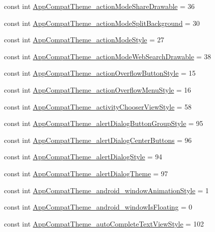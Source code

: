 \begin{CompactItemize}
const int \hyperlink{class__2doo_1_1_droid_1_1_resource_1_1_styleable_ff9288e6cb8ed83b9b31d1d58b8dc501}{AppCompatTheme\_\-actionModeShareDrawable} = 36
\item 
const int \hyperlink{class__2doo_1_1_droid_1_1_resource_1_1_styleable_8d5dd527ae99def55148154a99eea5f7}{AppCompatTheme\_\-actionModeSplitBackground} = 30
\item 
const int \hyperlink{class__2doo_1_1_droid_1_1_resource_1_1_styleable_7be1a9dafd56653f9360dbd1e57be841}{AppCompatTheme\_\-actionModeStyle} = 27
\item 
const int \hyperlink{class__2doo_1_1_droid_1_1_resource_1_1_styleable_998879e96366a9a0d90be6c00cbe3289}{AppCompatTheme\_\-actionModeWebSearchDrawable} = 38
\item 
const int \hyperlink{class__2doo_1_1_droid_1_1_resource_1_1_styleable_552ed91513281793f3c27ceaa3ff5cc9}{AppCompatTheme\_\-actionOverflowButtonStyle} = 15
\item 
const int \hyperlink{class__2doo_1_1_droid_1_1_resource_1_1_styleable_093df6f32eed924bbdbe4e8e8c224aeb}{AppCompatTheme\_\-actionOverflowMenuStyle} = 16
\item 
const int \hyperlink{class__2doo_1_1_droid_1_1_resource_1_1_styleable_6020d325769311d33f7508a43ed0f019}{AppCompatTheme\_\-activityChooserViewStyle} = 58
\item 
const int \hyperlink{class__2doo_1_1_droid_1_1_resource_1_1_styleable_7fd400690318b80a7c5ff5c5e5482c0c}{AppCompatTheme\_\-alertDialogButtonGroupStyle} = 95
\item 
const int \hyperlink{class__2doo_1_1_droid_1_1_resource_1_1_styleable_ae67cace9f3f50dc65a446fd84b26507}{AppCompatTheme\_\-alertDialogCenterButtons} = 96
\item 
const int \hyperlink{class__2doo_1_1_droid_1_1_resource_1_1_styleable_0887bc9745a3d1091a7bcfb94fc291dd}{AppCompatTheme\_\-alertDialogStyle} = 94
\item 
const int \hyperlink{class__2doo_1_1_droid_1_1_resource_1_1_styleable_57f809a4d3a79ab21d58067e964521d3}{AppCompatTheme\_\-alertDialogTheme} = 97
\item 
const int \hyperlink{class__2doo_1_1_droid_1_1_resource_1_1_styleable_be3e1a29ba21b41f0905876d35933fb6}{AppCompatTheme\_\-android\_\-windowAnimationStyle} = 1
\item 
const int \hyperlink{class__2doo_1_1_droid_1_1_resource_1_1_styleable_0063d7d50644d003a3773e1e0747ec2b}{AppCompatTheme\_\-android\_\-windowIsFloating} = 0
\item 
const int \hyperlink{class__2doo_1_1_droid_1_1_resource_1_1_styleable_6bfac191e1451165fb845563b5f1e027}{AppCompatTheme\_\-autoCompleteTextViewStyle} = 102

\end{CompactItemize}
